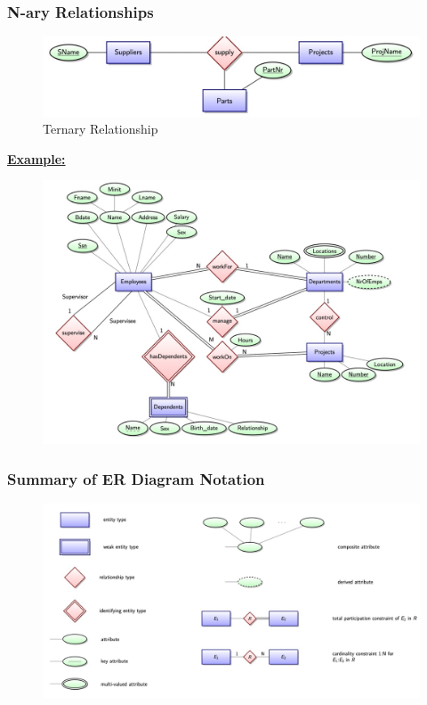 \subsubsection{N-ary Relationships}

\begin{figure}[H]
    \centering
    \includegraphics[width=0.5\linewidth]{images/Screenshot 2024-05-22 at 10.42.34.jpg}
    \caption{Ternary Relationship}
\end{figure}

\textbf{\underline{Example:}}
\begin{figure}[H]
    \centering
    \includegraphics[width=0.75\linewidth]{images/Screenshot 2024-05-22 at 10.45.08.jpg}
\end{figure}

\subsubsection{Summary of ER Diagram Notation}

\begin{figure}[H]
    \centering
    \includegraphics[width=0.75\linewidth]{images/Screenshot 2024-05-22 at 10.46.08.jpg}
\end{figure}


